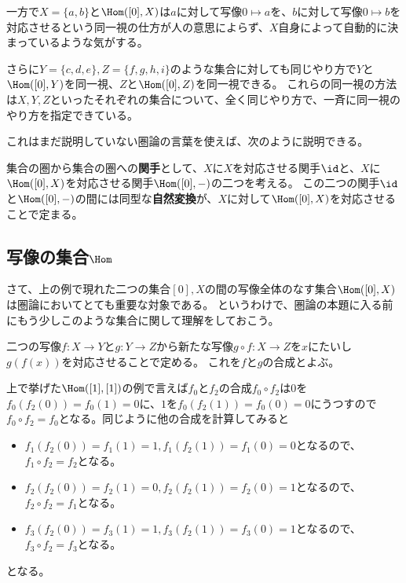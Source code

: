 \documentclass[uplatex]{jsarticle}
\begin{document}
一方で$X=\{a,b\}$と$\Hom([0],X)$は$a$に対して写像$0\mapsto a$を、$b$に対して写像$0\mapsto b$を対応させるという同一視の仕方が人の意思によらず、$X$自身によって自動的に決まっているような気がする。

さらに$Y=\{c,d,e\}, Z=\{f,g,h,i\}$のような集合に対しても同じやり方で$Y$と$\Hom([0],Y)$を同一視、$Z$と$\Hom([0],Z)$を同一視できる。
これらの同一視の方法は$X, Y, Z$といったそれぞれの集合について、全く同じやり方で、一斉に同一視のやり方を指定できている。

これはまだ説明していない圏論の言葉を使えば、次のように説明できる。

\begin{thm}
集合の圏から集合の圏への\textbf{関手}として、$X$に$X$を対応させる関手$\id$と、$X$に$\Hom([0],X)$を対応させる関手$\Hom([0],-)$の二つを考える。
この二つの関手$\id$と$\Hom([0],-)$の間には同型な\textbf{自然変換}が、$X$に対して$\Hom([0],X)$を対応させることで定まる。
\end{thm}

\subsection{写像の集合$\Hom$}
さて、上の例で現れた二つの集合$[0], X$の間の写像全体のなす集合$\Hom([0],X)$は圏論においてとても重要な対象である。
というわけで、圏論の本題に入る前にもう少しこのような集合に関して理解をしておこう。

\begin{dfn}[写像の合成]
二つの写像$f\colon X\to Y$と$g\colon Y\to Z$から新たな写像$g\circ f\colon X\to Z$を$x$にたいし$g(f(x))$を対応させることで定める。
これを$f$と$g$の合成とよぶ。
\end{dfn}

\begin{eg}
上で挙げた$\Hom([1],[1])$の例で言えば$f_0$と$f_2$の合成$f_0\circ f_2$は$0$を$f_0(f_2(0))=f_0(1)=0$に、$1$を$f_0(f_2(1))=f_0(0)=0$にうつすので$f_0\circ f_2=f_0$となる。同じように他の合成を計算してみると
\begin{itemize}
\item $f_1(f_2(0))=f_1(1)=1, f_1(f_2(1))=f_1(0)=0$となるので、$f_1\circ f_2=f_2$となる。
\item $f_2(f_2(0))=f_2(1)=0, f_2(f_2(1))=f_2(0)=1$となるので、$f_2\circ f_2=f_1$となる。
\item $f_3(f_2(0))=f_3(1)=1, f_3(f_2(1))=f_3(0)=1$となるので、$f_3\circ f_2=f_3$となる。
\end{itemize}
となる。
\end{eg}
\end{document}

